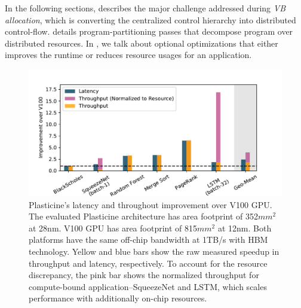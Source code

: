 In the following sections,  describes the major challenge addressed during {\em VB allocation}, which is converting the centralized control hierarchy into distributed control-flow.
 details program-partitioning passes that decompose program over distributed resources.
In , we talk about optional optimizations that either improves the runtime or reduces resource usages for an application.


\begin{figure}
\centering
\includegraphics[width=1\textwidth]{figs/slide_gpu.pdf}
\caption[Performance comparison with V100 GPU]{
  Plasticine's latency and throughout improvement over V100 GPU.
  The evaluated Plasticine architecture has area footprint of 352$mm^2$ at 28nm.
  V100 GPU has area footprint of 815$mm^2$ at 12nm.
  Both platforms have the same off-chip bandwidth at 1TB/s with HBM technology.
  Yellow and blue bars show the raw measured speedup in throughput and latency, respectively.
  To account for the resource discrepancy, the pink bar shows the normalized throughput
  for compute-bound application--SqueezeNet and LSTM, which scales performance with additionally
  on-chip resources.
}
\label{fig:peakutil}
\end{figure}
